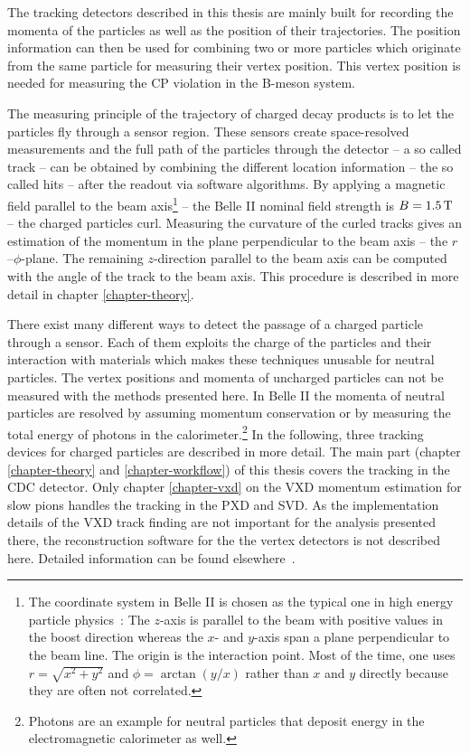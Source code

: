 The tracking detectors described in this thesis are mainly built for recording the momenta of the particles as well as the position of their trajectories. The position information can then be used for combining two or more particles which originate from the same particle for measuring their vertex position. This vertex position is needed for measuring the CP violation in the B-meson system. %

The measuring principle of the trajectory of charged decay products is to let the particles fly through a sensor region. These sensors create space-resolved measurements and the full path of the particles through the detector -- a so called track -- can be obtained by combining the different location information -- the so called hits -- after the readout via software algorithms. By applying a magnetic field parallel to the beam axis\footnote{The coordinate system in Belle II is chosen as the typical one in high energy particle physics~\cite{coordinate}: The $z$-axis is parallel to the beam with positive values in the boost direction whereas the $x$- and $y$-axis span a plane perpendicular to the beam line. The origin is the interaction point. Most of the time, one uses $r = \sqrt{x^2 + y^2}$ and $\phi = \arctan(y/x)$ rather than $x$ and $y$ directly because they are often not correlated.} -- the Belle II nominal field strength is $B = \unit[1.5]{T}$ -- the charged particles curl. Measuring the curvature of the curled tracks gives an estimation of the momentum in the plane perpendicular to the beam axis -- the $r$--$\phi$-plane. The remaining $z$-direction parallel to the beam axis can be computed with the angle of the track to the beam axis. This procedure is described in more detail in chapter \ref{chapter-theory}.

There exist many different ways to detect the passage of a charged particle through a sensor. Each of them exploits the charge of the particles and their interaction with materials which makes these techniques unusable for neutral particles. The vertex positions and momenta of uncharged particles can not be measured with the methods presented here. In Belle II the momenta of neutral particles are resolved by assuming momentum conservation or by measuring the total energy of photons in the calorimeter.\footnote{Photons are an example for neutral particles that deposit energy in the electromagnetic calorimeter as well.} In the following, three tracking devices for charged particles are described in more detail. The main part (chapter \ref{chapter-theory} and \ref{chapter-workflow}) of this thesis covers the tracking in the CDC detector. Only chapter \ref{chapter-vxd} on the VXD momentum estimation for slow pions handles the tracking in the PXD and SVD.  As the implementation details of the VXD track finding are not important for the analysis presented there, the reconstruction software for the the vertex detectors is not described here. Detailed information can be found elsewhere~\cite{jakob}.

